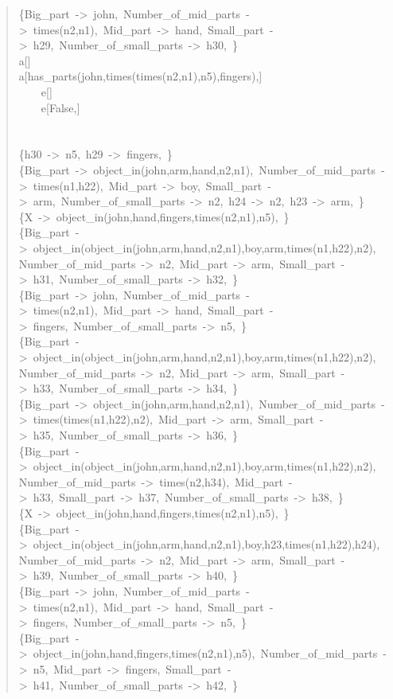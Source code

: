 \begin{quote}
\{Big\_part~->~john,~Number\_of\_mid\_parts~->~times(n2,n1),~Mid\_part~->~hand,~Small\_part~->~h29,~Number\_of\_small\_parts~->~h30,~\}\\
a[]\\
a[has\_parts(john,times(times(n2,n1),n5),fingers),]\\
~~~~e[]\\
~~~~e[False,]\\
~\\
~\\
\{h30~->~n5,~h29~->~fingers,~\}\\
\{Big\_part~->~object\_in(john,arm,hand,n2,n1),~Number\_of\_mid\_parts~->~times(n1,h22),~Mid\_part~->~boy,~Small\_part~->~arm,~Number\_of\_small\_parts~->~n2,~h24~->~n2,~h23~->~arm,~\}\\
\{X~->~object\_in(john,hand,fingers,times(n2,n1),n5),~\}\\
\{Big\_part~->~object\_in(object\_in(john,arm,hand,n2,n1),boy,arm,times(n1,h22),n2),~Number\_of\_mid\_parts~->~n2,~Mid\_part~->~arm,~Small\_part~->~h31,~Number\_of\_small\_parts~->~h32,~\}\\
\{Big\_part~->~john,~Number\_of\_mid\_parts~->~times(n2,n1),~Mid\_part~->~hand,~Small\_part~->~fingers,~Number\_of\_small\_parts~->~n5,~\}\\
\{Big\_part~->~object\_in(object\_in(john,arm,hand,n2,n1),boy,arm,times(n1,h22),n2),~Number\_of\_mid\_parts~->~n2,~Mid\_part~->~arm,~Small\_part~->~h33,~Number\_of\_small\_parts~->~h34,~\}\\
\{Big\_part~->~object\_in(john,arm,hand,n2,n1),~Number\_of\_mid\_parts~->~times(times(n1,h22),n2),~Mid\_part~->~arm,~Small\_part~->~h35,~Number\_of\_small\_parts~->~h36,~\}\\
\{Big\_part~->~object\_in(object\_in(john,arm,hand,n2,n1),boy,arm,times(n1,h22),n2),~Number\_of\_mid\_parts~->~times(n2,h34),~Mid\_part~->~h33,~Small\_part~->~h37,~Number\_of\_small\_parts~->~h38,~\}\\
\{X~->~object\_in(john,hand,fingers,times(n2,n1),n5),~\}\\
\{Big\_part~->~object\_in(object\_in(john,arm,hand,n2,n1),boy,h23,times(n1,h22),h24),~Number\_of\_mid\_parts~->~n2,~Mid\_part~->~arm,~Small\_part~->~h39,~Number\_of\_small\_parts~->~h40,~\}\\
\{Big\_part~->~john,~Number\_of\_mid\_parts~->~times(n2,n1),~Mid\_part~->~hand,~Small\_part~->~fingers,~Number\_of\_small\_parts~->~n5,~\}\\
\{Big\_part~->~object\_in(john,hand,fingers,times(n2,n1),n5),~Number\_of\_mid\_parts~->~n5,~Mid\_part~->~fingers,~Small\_part~->~h41,~Number\_of\_small\_parts~->~h42,~\}\\

\end{quote}
